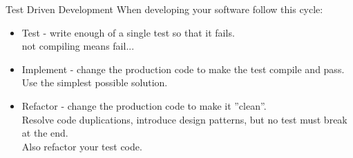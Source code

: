 \documentclass[SoftwareQuality.tex]{subfiles}
\begin{document}
\begin{frame}{Test Driven Development} 
When developing your software follow this cycle:
\vfill
\begin{itemize}
\item {\color{red}Test - write enough of a single test so that it fails.\\
   {\footnotesize not compiling means fail...}}
\vfill
\item {\color{green}Implement - change the production code to make the test compile and pass.\\
   {\footnotesize Use the simplest possible solution.}}
\vfill
\item {\color{green}Refactor - change the production code to make it ''clean''.\\
   {\footnotesize Resolve code duplications, introduce design patterns, but no test must break at the end.\\Also refactor your test code.}}
\vfill
\end{itemize}


\end{frame}
\end{document}
